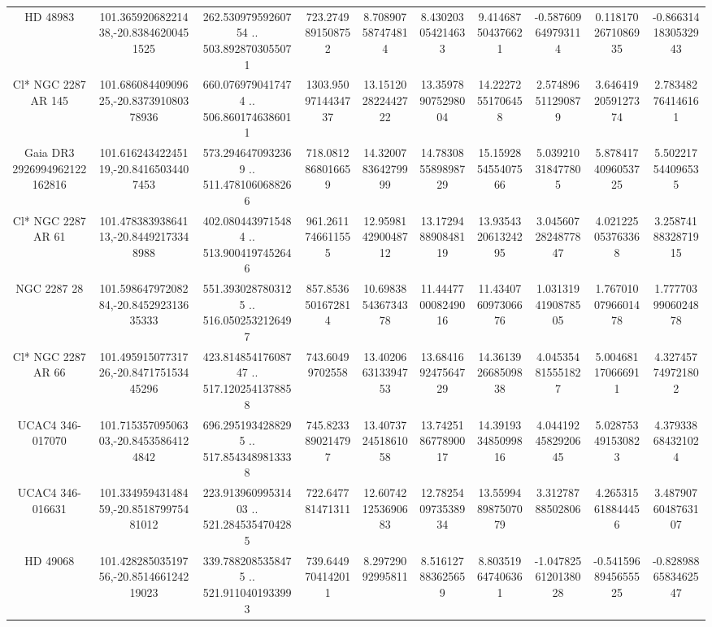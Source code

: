 \begin{table}
\begin{tabular}{cccccccccc}
HD  48983 & 101.36592068221438,-20.83846200451525 & 262.53097959260754 .. 503.8928703055071 & 723.2749891508752 & 8.708907587474814 & 8.430203054214633 & 9.414687504376621 & -0.587609649793114 & 0.1181702671086935 & -0.8663141830532943 \\
Cl* NGC 2287     AR     145 & 101.68608440909625,-20.837391080378936 & 660.0769790417474 .. 506.8601746386011 & 1303.9509714434737 & 13.151202822442722 & 13.359789075298004 & 14.22272551706458 & 2.574896511290879 & 3.6464192059127374 & 2.783482764146161 \\
Gaia DR3 2926994962122162816 & 101.61624342245119,-20.84165034407453 & 573.2946470932369 .. 511.4781060688266 & 718.0812868016659 & 14.320078364279999 & 14.783085589898729 & 15.159285455407566 & 5.039210318477805 & 5.8784174096053725 & 5.502217544096535 \\
Cl* NGC 2287     AR      61 & 101.47838393864113,-20.84492173348988 & 402.0804439715484 .. 513.9004197452646 & 961.2611746611555 & 12.959814290048712 & 13.172948890848119 & 13.935432061324295 & 3.0456072824877847 & 4.021225053763368 & 3.2587418832871915 \\
NGC  2287    28 & 101.59864797208284,-20.845292313635333 & 551.3930287803125 .. 516.0502532126497 & 857.8536501672814 & 10.698385436734378 & 11.444770008249016 & 11.434076097306676 & 1.0313194190878505 & 1.7670100796601478 & 1.7777039906024878 \\
Cl* NGC 2287     AR      66 & 101.49591507731726,-20.847175153445296 & 423.81485417608747 .. 517.1202541378858 & 743.60499702558 & 13.402066313394753 & 13.684169247564729 & 14.361392668509838 & 4.045354815551827 & 5.004681170666911 & 4.327457749721802 \\
UCAC4 346-017070 & 101.71535709506303,-20.84535864124842 & 696.2951934288295 .. 517.8543489813338 & 745.8233890214797 & 13.407372451861058 & 13.742518677890017 & 14.391933485099816 & 4.0441924582920645 & 5.028753491530823 & 4.379338684321024 \\
UCAC4 346-016631 & 101.33495943148459,-20.851879975481012 & 223.91396099531403 .. 521.2845354704285 & 722.647781471311 & 12.607421253690683 & 12.782540973538934 & 13.559948987507079 & 3.31278788502806 & 4.265315618844456 & 3.4879076048763107 \\
HD  49068 & 101.42828503519756,-20.851466124219023 & 339.7882085358475 .. 521.9110401933993 & 739.6449704142011 & 8.29729092995811 & 8.516127883625659 & 8.803519647406361 & -1.0478256120138028 & -0.5415968945655525 & -0.8289886583462547 \\

\end{tabular}
\end{table}
